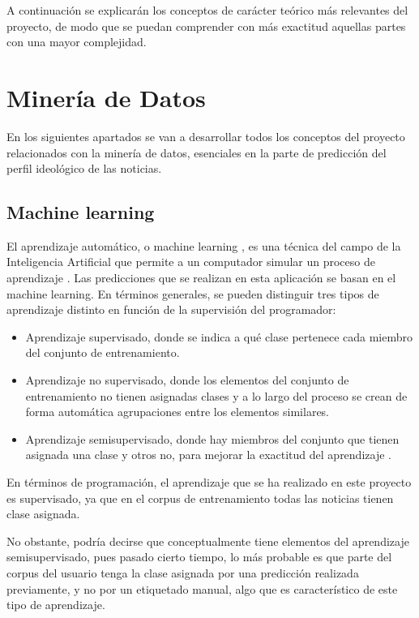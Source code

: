A continuación se explicarán los conceptos de carácter teórico más relevantes del proyecto, de modo que se puedan comprender con más exactitud aquellas partes con una mayor complejidad.


\section{Minería de Datos}

En los siguientes apartados se van a desarrollar todos los conceptos del proyecto relacionados con la minería de datos, esenciales en la parte de predicción del perfil ideológico de las noticias.

\subsection{Machine learning}

El aprendizaje automático, o machine learning \cite{andrieu2003introduction}, es una técnica del campo de la Inteligencia Artificial que permite a un computador simular un proceso de aprendizaje \cite{wiki:machinelearning}. Las predicciones que se realizan en esta aplicación se basan en el machine learning. En términos generales, se pueden distinguir tres tipos de aprendizaje distinto en función de la supervisión del programador:

\begin{itemize}

\item Aprendizaje supervisado, donde se indica a qué clase pertenece cada miembro del conjunto de entrenamiento.

\item Aprendizaje no supervisado, donde los elementos del conjunto de entrenamiento no tienen asignadas clases y a lo largo del proceso se crean de forma automática 
agrupaciones entre los elementos similares.

\item Aprendizaje semisupervisado, donde hay miembros del conjunto que tienen asignada una clase y otros no, para mejorar la exactitud del aprendizaje \cite{wiki:semisupervised}.

\end{itemize}

En términos de programación, el aprendizaje que se ha realizado en este proyecto es supervisado, ya que en el corpus de entrenamiento todas las noticias tienen clase asignada.

No obstante, podría decirse que conceptualmente tiene elementos del aprendizaje semisupervisado, pues pasado cierto tiempo, lo más probable es que parte del corpus del usuario tenga la clase asignada por una predicción realizada previamente, y no por un etiquetado manual, algo que es característico de este tipo de aprendizaje.

